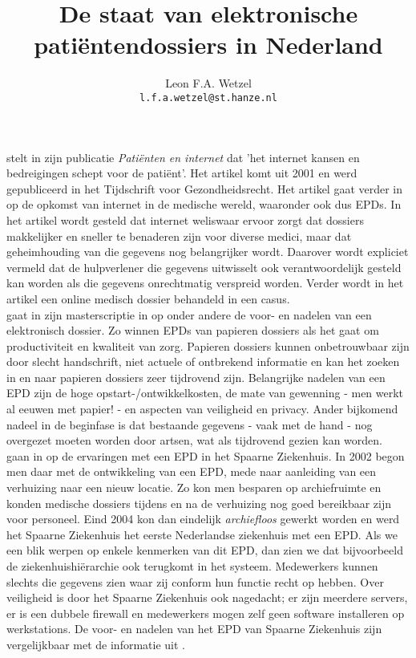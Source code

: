 \documentclass[a4paper, 10pt]{article}
\title{De staat van elektronische patiëntendossiers in Nederland}
\author{Leon F.A. Wetzel\\\texttt{l.f.a.wetzel@st.hanze.nl}}
\begin{document}
\maketitle

\citet{Hooghiemstra2001} stelt in zijn publicatie \textit{Patiënten en internet} dat 'het internet kansen en bedreigingen schept voor de patiënt'. Het artikel komt uit 2001 en werd gepubliceerd in het Tijdschrift voor Gezondheidsrecht. Het artikel gaat verder in op de opkomst van internet in de medische wereld, waaronder ook dus EPDs. In het artikel wordt gesteld dat internet weliswaar ervoor zorgt dat dossiers makkelijker en sneller te benaderen zijn voor diverse medici, maar dat geheimhouding van die gegevens nog belangrijker wordt. Daarover wordt expliciet vermeld dat de hulpverlener die gegevens uitwisselt ook verantwoordelijk gesteld kan worden als die gegevens onrechtmatig verspreid worden. Verder wordt in het artikel een online medisch dossier behandeld in een casus.\\

\citet{mies2010invoeren} gaat in zijn masterscriptie in op onder andere de voor- en nadelen van een elektronisch dossier. Zo winnen EPDs van papieren dossiers als het gaat om productiviteit en kwaliteit van zorg. Papieren dossiers kunnen onbetrouwbaar zijn door slecht handschrift, niet actuele of ontbrekend informatie en kan het zoeken in en naar papieren dossiers zeer tijdrovend zijn. Belangrijke nadelen van een EPD zijn de hoge opstart-/ontwikkelkosten, de mate van gewenning - men werkt al eeuwen met papier! - en aspecten van veiligheid en privacy. Ander bijkomend nadeel in de beginfase is dat bestaande gegevens - vaak met de hand - nog overgezet moeten worden door artsen, wat als tijdrovend gezien kan worden.\\ 


\citet{Bokma2007} gaan in op de ervaringen met een EPD in het Spaarne Ziekenhuis. In 2002 begon men daar met de ontwikkeling van een EPD, mede naar aanleiding van een verhuizing naar een nieuw locatie. Zo kon men besparen op archiefruimte en konden medische dossiers tijdens en na de verhuizing nog goed bereikbaar zijn voor personeel. Eind 2004 kon dan eindelijk \textit{archiefloos} gewerkt worden en werd het Spaarne Ziekenhuis het eerste Nederlandse ziekenhuis met een EPD. Als we een blik werpen op enkele kenmerken van dit EPD, dan zien we dat bijvoorbeeld de ziekenhuishiërarchie ook terugkomt in het systeem. Medewerkers kunnen slechts die gegevens zien waar zij conform hun functie recht op hebben. Over veiligheid is door het Spaarne Ziekenhuis ook nagedacht; er zijn meerdere servers, er is een dubbele firewall en medewerkers mogen zelf geen software installeren op werkstations. De voor- en nadelen van het EPD van Spaarne Ziekenhuis zijn vergelijkbaar met de informatie uit \citet{mies2010invoeren}.\\
\end{document}
